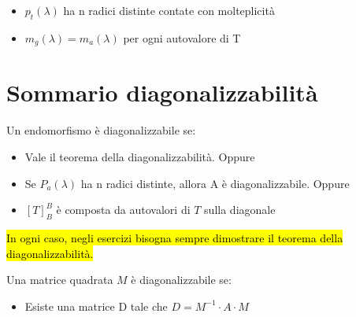 \documentclass[a4paper, 10pt]{article}
\begin{document}
\begin{itemize}
	\item $p_t(\lambda)$ ha n radici distinte contate con molteplicità
	\item $m_g(\lambda) = m_a(\lambda)$ per ogni autovalore di T
\end{itemize}

\section{Sommario diagonalizzabilità}

Un endomorfismo è diagonalizzabile se:

\begin{itemize}
	\item Vale il teorema della diagonalizzabilità. Oppure
	\item Se $P_a(\lambda)$ ha n radici distinte, allora A è diagonalizzabile. Oppure
	\item $[T]^B_B$ è composta da autovalori di $T$ sulla diagonale  
\end{itemize}

\hl{In ogni caso, negli esercizi bisogna sempre dimostrare il teorema della diagonalizzabilità.}

Una matrice quadrata $M$ è diagonalizzabile se:

\begin{itemize}
	\item Esiste una matrice D tale che $D=M^{-1} \cdot A \cdot M$
\end{itemize}
\end{document}
